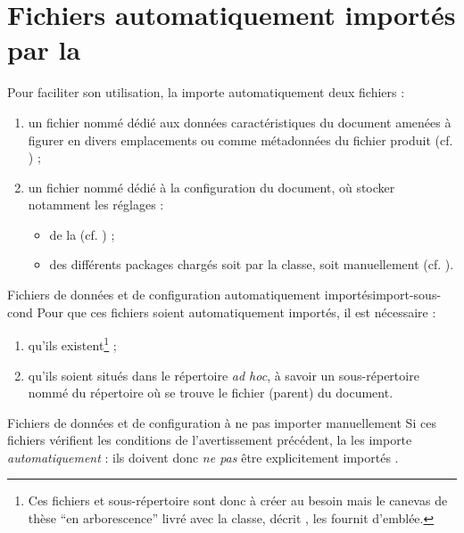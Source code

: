 \chapter{Fichiers automatiquement importés par la \yatCl{}}
\label{cha-fichiers-importes-par}

Pour faciliter son utilisation, la \yatCl{} importe automatiquement deux
fichiers :
\begin{enumerate}
\item%
  un fichier nommé \file{\characteristicsfile} dédié aux données
  caractéristiques du document amenées à figurer en divers emplacements ou comme
  métadonnées du fichier \pdf{} produit (cf. ) ;
\item%
  un fichier nommé \file{\configurationfile} dédié à la configuration du
  document, où stocker notamment les réglages :
  \begin{itemize}
  \item de la \yatCl{} (cf. ) ;
  \item des différents packages chargés soit par la classe, soit manuellement
    (cf. ).
  \end{itemize}
\end{enumerate}
\begin{dbwarning}{Fichiers de données et de configuration automatiquement importés}{import-sous-cond}
  Pour que ces fichiers
  soient automatiquement importés, il est nécessaire :
  \begin{enumerate}
  \item qu'ils existent\footnote{Ces fichiers et sous-répertoire sont donc
      à créer au besoin mais le canevas de thèse \enquote{en arborescence} livré avec
      la classe, décrit , les fournit d'emblée.} ;
  \item%
    qu'ils soient situés dans le répertoire \emph{ad hoc}, à savoir un
    sous-répertoire nommé \folder{\configurationdirectory} du répertoire où se
    trouve le fichier (parent) du document.
  \end{enumerate}
\end{dbwarning}
%
\begin{dbwarning}{Fichiers de données et de configuration à ne pas importer manuellement}{}
  Si ces fichiers
  vérifient les conditions de l'avertissement précédent, la \yatCl{} les
  importe \emph{automatiquement} : ils doivent donc \emph{ne pas} être
  explicitement importés .
\end{dbwarning}
